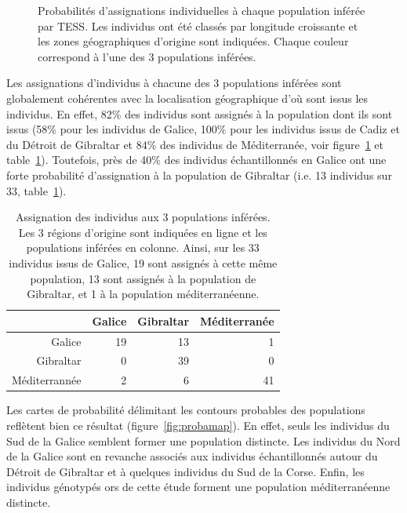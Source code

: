 \documentclass[a4paper,12pt,twoside]{article}\usepackage[]{graphicx}\usepackage[]{color}
\begin{document}
\begin {bibunit} [newbst]
\begin{figure}[htpb]
{}

\caption[Probabilités d'assignations individuelles à chaque population inférée par TESS]{Probabilités d'assignations individuelles à chaque population inférée par TESS. Les individus ont été classés par longitude croissante et les zones géographiques d'origine sont indiquées. Chaque couleur correspond à l'une des 3 populations inférées.}\label{fig:barplot}
\end{figure}



Les assignations d'individus à chacune des 3 populations inférées sont globalement cohérentes avec la localisation géographique d'où sont issus les individus. En effet, 82\% des individus sont assignés à la population dont ils sont issus (58\% pour les individus de Galice, 100\% pour les individus issus de Cadiz et du Détroit de Gibraltar et  84\% des individus de Méditerranée, voir figure~\ref{fig:barplot} et table~\ref{table:assignation}). Toutefois, près de 40\% des individus échantillonnés en Galice ont une forte probabilité d'assignation à la population de Gibraltar (i.e. 13 individus sur 33, table~\ref{table:assignation}).

\begin{table}[ht]
\centering
\caption[Assignation des individus aux 3 populations inférées.]{Assignation des individus aux 3 populations inférées. Les 3 régions d'origine sont indiquées en ligne et les populations inférées en colonne. Ainsi, sur les 33 individus issus de Galice, 19 sont assignés à cette même population, 13 sont assignés à la population de Gibraltar, et 1 à la population méditerranéenne.}
\label{table:assignation}
\begin{tabular}{rrrr}
  \toprule
 & Galice & Gibraltar & Méditerranée \\ 
  \midrule
Galice &  19 &  13 &   1 \\ 
  Gibraltar &   0 &  39 &   0 \\ 
  Méditerrannée &   2 &   6 &  41 \\ 
   \bottomrule
\end{tabular}
\end{table}

Les cartes de probabilité délimitant les contours probables des populations reflètent bien ce résultat (figure~\ref{fig:probamap}). En effet, seuls les individus du Sud de la Galice semblent former une population distincte. Les individus du Nord de la Galice sont en revanche associés aux individus échantillonnés autour du Détroit de Gibraltar et à quelques individus du Sud de la Corse. Enfin, les individus génotypés ors de cette étude forment une population méditerranéenne distincte.


\end{bibunit}
\end{document}
